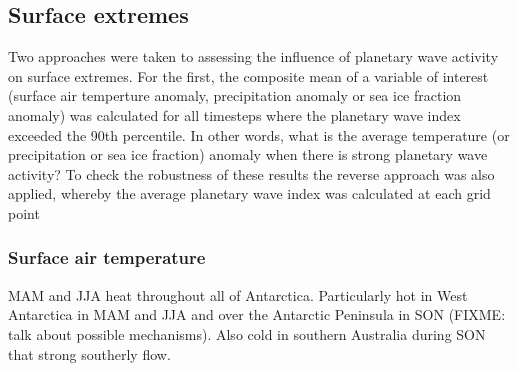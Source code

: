 \subsection{Surface extremes}

Two approaches were taken to assessing the influence of planetary wave activity on surface extremes. For the first, the composite mean of a variable of interest (surface air temperture anomaly, precipitation anomaly or sea ice fraction anomaly) was calculated for all timesteps where the planetary wave index exceeded the 90th percentile. In other words, what is the average temperature (or precipitation or sea ice fraction) anomaly when there is strong planetary wave activity? To check the robustness of these results the reverse approach was also applied, whereby the average planetary wave index was calculated at each grid point  

\subsubsection{Surface air temperature}

MAM and JJA heat throughout all of Antarctica. Particularly hot in West Antarctica in MAM and JJA and over the Antarctic Peninsula in SON (FIXME: talk about possible mechanisms). Also cold in southern Australia during SON that strong southerly flow.


